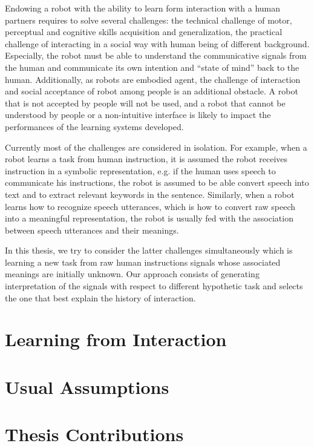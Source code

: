 Endowing a robot with the ability to learn form interaction with a human partners requires to solve several challenges: the technical challenge of motor, perceptual and cognitive skills acquisition and generalization, the practical challenge of interacting in a social way with human being of different background. Especially, the robot must be able to understand the communicative signals from the human and communicate its own intention and ``state of mind'' back to the human. Additionally, as robots are embodied agent, the challenge of interaction and social acceptance of robot among people is an additional obstacle. A robot that is not accepted by people will not be used, and a robot that cannot be understood by people or a non-intuitive interface is likely to impact the performances of the learning systems developed.

Currently most of the challenges are considered in isolation. For example, when a robot learns a task from human instruction, it is assumed the robot receives instruction in a symbolic representation, e.g. if the human uses speech to communicate his instructions, the robot is assumed to be able convert speech into text and to extract relevant keywords in the sentence. Similarly, when a robot learns how to recognize speech utterances, which is how to convert raw speech into a meaningful representation, the robot is usually fed with the association between speech utterances and their meanings.

In this thesis, we try to consider the latter challenges simultaneously which is learning a new task from raw human instructions signals whose associated meanings are initially unknown. Our approach consists of generating interpretation of the signals with respect to different hypothetic task and selects the one that best explain the history of interaction.


\section{Learning from Interaction}


\section{Usual Assumptions}


\section{Thesis Contributions}


